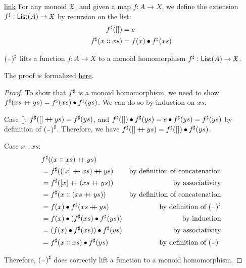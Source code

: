 \begin{definition}{\href{https://windtfw.com/agda-symmetries/Cubical.Structures.Set.Mon.List.html#1114}{link}}
    For any monoid $\mathfrak{X}$, and given a map $f : A \to X$,
    we define the extension ${f}^{\sharp} : \operatorname{\mathsf{List}}(A) \to \mathfrak{X}$ by recursion on the list:
    \begin{align*}
        {f}^{\sharp}([])      & = e                       \\
        {f}^{\sharp}(x :: xs) & =  f(x) \mathbin{\bullet} {f}^{\sharp}(xs)
    \end{align*}
\end{definition}

\begin{propositionrep}
    ${({\scriptstyle{-}})}^{\sharp}$ lifts a function $f : A \to X$ to a monoid homomorphism ${f}^{\sharp} : \operatorname{\mathsf{List}}(A) \to \mathfrak{X}$.
\end{propositionrep}

\begin{proofsketch}
    The proof is formalized \href{https://windtfw.com/agda-symmetries/Cubical.Structures.Set.Mon.List.html#1390}{here}.
\end{proofsketch}

\begin{proof}
    To show that ${f}^{\sharp}$ is a monoid homomorphism,
    we need to show ${f}^{\sharp}(xs \mathbin{+\kern -0.4em+} ys) = {f}^{\sharp}(xs) \mathbin{\bullet} {f}^{\sharp}(ys)$.
    We can do so by induction on $xs$.

    Case []:
    ${f}^{\sharp}([] \mathbin{+\kern -0.4em+} ys) = {f}^{\sharp}(ys)$,
    and ${f}^{\sharp}([]) \mathbin{\bullet} {f}^{\sharp}(ys) = e \mathbin{\bullet} {f}^{\sharp}(ys) = {f}^{\sharp}(ys)$
    by definition of ${({\scriptstyle{-}})}^{\sharp}$. Therefore, we have
    ${f}^{\sharp}([] \mathbin{+\kern -0.4em+} ys) = {f}^{\sharp}([]) \mathbin{\bullet} {f}^{\sharp}(ys)$.

    Case $x :: xs$:
    \begin{align*}
         & \ext{f}((x :: xs) \doubleplus ys)                                                           \\
         & = \ext{f}(([ x ] \doubleplus xs) \doubleplus ys) & \text{by definition of concatenation}    \\
         & = \ext{f}([ x ] \doubleplus (xs \doubleplus ys)) & \text{by associativity}                  \\
         & = \ext{f}(x :: (xs \doubleplus ys))              & \text{by definition of concatenation}    \\
         & = f(x) \mult \ext{f}(xs \doubleplus ys)          & \text{by definition of $\ext{(\blank)}$} \\
         & = f(x) \mult (\ext{f}(xs) \mult \ext{f}(ys))     & \text{by induction}                      \\
         & = (f(x) \mult \ext{f}(xs)) \mult \ext{f}(ys)     & \text{by associativity}                  \\
         & = \ext{f}(x :: xs) \mult \ext{f}(ys)             & \text{by definition of $\ext{(\blank)}$} \\
    \end{align*}

    Therefore, ${({\scriptstyle{-}})}^{\sharp}$ does correctly lift a function to a monoid homomorphism.
\end{proof}

